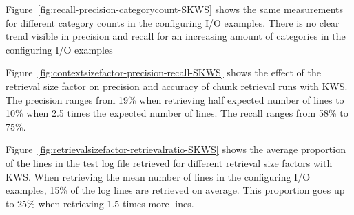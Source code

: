 \documentclass[\myrootdir/main.tex]{subfiles}
\begin{document}
Figure~\ref{fig:recall-precision-categorycount-SKWS} shows the same measurements for different category counts in the configuring I/O examples.
There is no clear trend visible in precision and recall for an increasing amount of categories in the configuring I/O examples

Figure~\ref{fig:contextsizefactor-precision-recall-SKWS} shows the effect of the retrieval size factor on precision and accuracy of chunk retrieval runs with KWS\@.
The precision ranges from 19\% when retrieving half expected number of lines to 10\% when 2.5 times the expected number of lines.
The recall ranges from 58\% to 75\%.

Figure~\ref{fig:retrievalsizefactor-retrievalratio-SKWS} shows the average proportion of the lines in the test log file retrieved for different retrieval size factors with KWS\@.
When retrieving the mean number of lines in the configuring I/O examples, 15\% of the log lines are retrieved on average.
This proportion goes up to 25\% when retrieving 1.5 times more lines.
\end{document}
